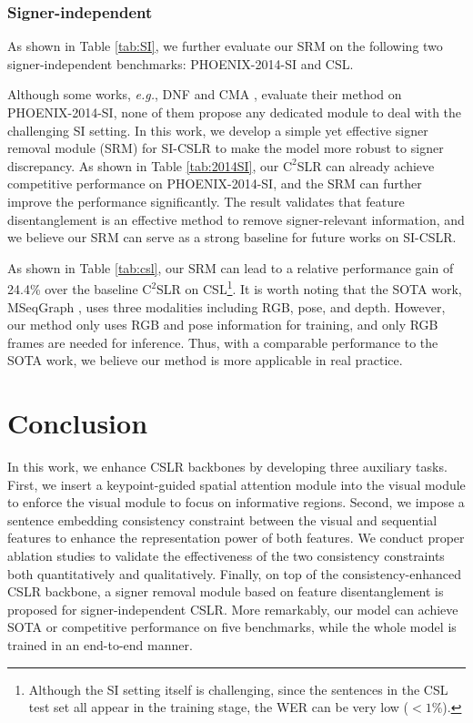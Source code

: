 \documentclass[acmsmall,screen]{acmart}
\def\eg{\emph{e.g.}} \def\Eg{\emph{E.g.}}
\begin{document}
 \subsubsection{Signer-independent}
As shown in Table \ref{tab:SI}, we further evaluate our SRM on the following two signer-independent benchmarks: PHOENIX-2014-SI and CSL.

Although some works, \eg, DNF \cite{dnf} and CMA \cite{cma}, evaluate their method on PHOENIX-2014-SI, none of them propose any dedicated module to deal with the challenging SI setting.
In this work, we develop a simple yet effective signer removal module (SRM) for SI-CSLR to make the model more robust to signer discrepancy. 
As shown in Table \ref{tab:2014SI}, our $\text{C}^2$SLR can already achieve competitive performance on PHOENIX-2014-SI, and the SRM can further improve the performance significantly.
The result validates that feature disentanglement is an effective method to remove signer-relevant information, and we believe our SRM can serve as a strong baseline for future works on SI-CSLR.

As shown in Table \ref{tab:csl}, our SRM can lead to a relative performance gain of 24.4\% over the baseline $\text{C}^2$SLR on CSL\footnote{Although the SI setting itself is challenging, since the sentences in the CSL test set all appear in the training stage, the WER can be very low ($<1$\%).}.
It is worth noting that the SOTA work, MSeqGraph \cite{tang2021graph}, uses three modalities including RGB, pose, and depth.
However, our method only uses RGB and pose information for training, and only RGB frames are needed for inference.
Thus, with a comparable performance to the SOTA work, we believe our method is more applicable in real practice.





















 \section{Conclusion}
In this work, we enhance CSLR backbones by developing three auxiliary tasks.
First, we insert a keypoint-guided spatial attention module into the visual module to enforce the visual module to focus on informative regions.
Second, we impose a sentence embedding consistency constraint between the visual and sequential features to enhance the representation power of both features.
We conduct proper ablation studies to validate the effectiveness of the two consistency constraints both quantitatively and qualitatively.
Finally, on top of the consistency-enhanced CSLR backbone, a signer removal module based on feature disentanglement is proposed for signer-independent CSLR.
More remarkably, our model can achieve SOTA or competitive performance on five benchmarks, while the whole model is trained in an end-to-end manner.
\end{document}

